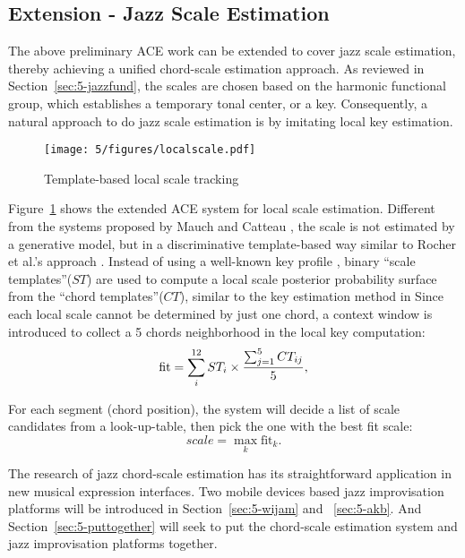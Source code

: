 \subsection{Extension - Jazz Scale Estimation}
The above preliminary ACE work can be extended to cover jazz scale estimation, thereby achieving a unified chord-scale estimation approach. As reviewed in Section~\ref{sec:5-jazzfund}, the scales are chosen based on the harmonic functional group, which establishes a temporary tonal center, or a key. Consequently, a natural approach to do jazz scale estimation is by imitating local key estimation.
\begin{figure}[htb]
    \centering
        \texttt{[image: 5/figures/localscale.pdf]}
    \caption{Template-based local scale tracking}
    \label{fig:5-localscale}
\end{figure}
Figure~\ref{fig:5-localscale} shows the extended ACE system for local scale estimation. Different from the systems proposed by Mauch \cite{mauch2010simultaneous} and Catteau \cite{catteau2007probabilistic}, the scale is not estimated by a generative model, but in a discriminative template-based way similar to Rocher et al.'s approach \cite{rocher2010concurrent}. Instead of using a well-known key profile \cite{temperley2004cognition}, binary ``scale templates''($ST$) are used to compute a local scale posterior probability surface from the ``chord templates''($CT$), similar to the key estimation method in \cite{hu2015safedj} Since each local scale cannot be determined by just one chord, a context window is introduced to collect a 5 chords neighborhood in the local key computation:
\begin{equation}
\text{fit} = \sum_i^{12} ST_i \times {\sum_{j=1}^5 CT_{ij} \over 5},
\end{equation}

For each segment (chord position), the system will decide a list of scale candidates from a look-up-table, then pick the one with the best fit scale:
\begin{equation}
scale = \max_k \text{fit}_k.
\end{equation}

The research of jazz chord-scale estimation has its straightforward application in new musical expression interfaces. Two mobile devices based jazz improvisation platforms will be introduced in Section~\ref{sec:5-wijam} and ~\ref{sec:5-akb}. And Section~\ref{sec:5-puttogether} will seek to put the chord-scale estimation system and jazz improvisation platforms together.

